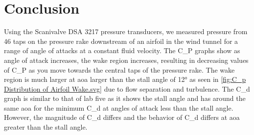 \chapter{Conclusion}
\label{cp:conclusion}
Using the Scanivalve DSA 3217 pressure transducers, we measured pressure from \num{46} taps on the pressure rake downstream of an airfoil in the wind tunnel for a range of angle of attacks at a constant fluid velocity. The \gls{C_P} graphs show as angle of attack increases, the wake region increases, resulting in decreasing values of \gls{C_P} as you move towards the central taps of the pressure rake. The wake region is much larger at \acrshort{aoa} larger than the stall angle of \num{12}\unit{\degree} as seen in \autoref{fig:C_p Distribution of Airfoil Wake.svg} due to flow separation and turbulence. The \gls{C_d} graph is similar to that of lab five as it shows the stall angle and has around the same \acrshort{aoa} for the minimum \gls{C_d} at angles of attack less than the stall angle. However, the magnitude of \gls{C_d} differs and the behavior of \gls{C_d} differs at \acrshort{aoa} greater than the stall angle.